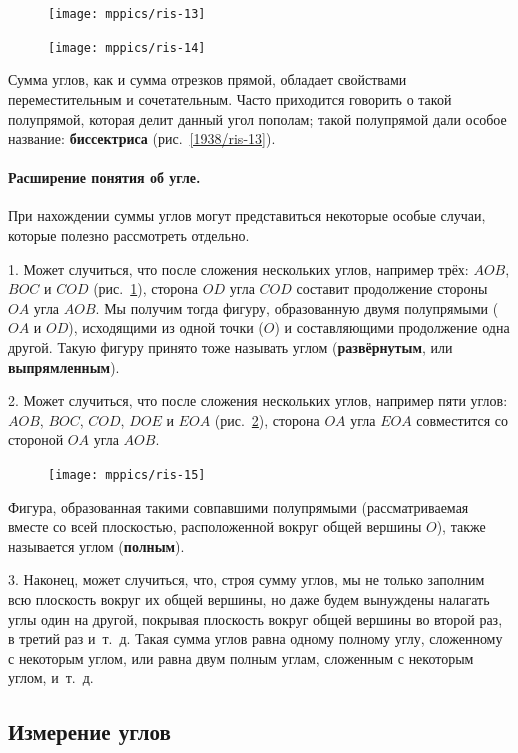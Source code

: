 \documentclass[oneside]{book}
\begin{document}
\begin{figure}
\centering
\texttt{[image: mppics/ris-13]}
\caption{}\label{1938/ris-13}
\bigskip
\texttt{[image: mppics/ris-14]}
\caption{}\label{1938/ris-14}
\end{figure}

Сумма углов, как и сумма отрезков прямой, обладает свойствами переместительным и сочетательным.
Часто приходится говорить о такой полупрямой, которая делит данный угол пополам;
такой полупрямой дали особое название:
\textbf{биссектриса} (рис.~\ref{1938/ris-13}).


\paragraph{Расширение понятия об угле.}\label{1938/16}
При нахождении суммы углов могут представиться некоторые особые случаи, которые полезно рассмотреть отдельно.

1.
Может случиться, что после сложения нескольких углов, например трёх:
$AOB$, $BOC$ и $COD$ (рис.~\ref{1938/ris-14}), сторона $OD$ угла $COD$ составит продолжение стороны $OA$ угла $AOB$.
Мы получим тогда фигуру, образованную двумя полупрямыми ($OA$ и $OD$), исходящими из одной точки ($O$) и составляющими продолжение одна другой.
Такую фигуру принято тоже называть углом (\textbf{развёрнутым}, или \textbf{выпрямленным}).

2.
Может случиться, что после сложения нескольких углов, например пяти углов:
$AOB$, $BOC$, $COD$, $DOE$ и $EOA$ (рис.~\ref{1938/ris-15}), сторона $OA$ угла $EOA$ совместится со стороной $OA$ угла $AOB$.

\begin{figure}
\centering
\texttt{[image: mppics/ris-15]}
\caption{}\label{1938/ris-15}
\end{figure}

Фигура, образованная такими совпавшими полупрямыми (рассматриваемая вместе со всей плоскостью, расположенной вокруг общей вершины $O$), также называется углом (\textbf{полным}).


3.
Наконец, может случиться, что, строя сумму углов, мы не только заполним всю плоскость вокруг их общей вершины, но даже будем вынуждены налагать углы один на другой, покрывая плоскость вокруг общей вершины во второй раз, в третий раз и~т.~д.
Такая сумма углов равна одному полному углу, сложенному с некоторым углом, или равна двум полным углам, сложенным с некоторым углом, и~т.~д.

\subsection*{Измерение углов}
\end{document}
